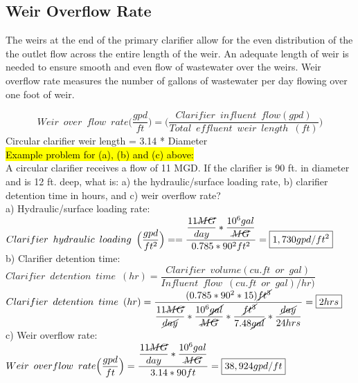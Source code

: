 \subsection{Weir Overflow Rate}
The weirs at the end of the primary clarifier allow for the even distribution of the the outlet flow across the entire length of the weir.  An adequate length of weir is needed to ensure smooth and even flow of wastewater over the weirs.  Weir overflow rate measures the number of gallons of wastewater per day flowing over one foot of weir. 

		$$Weir \enspace over \enspace flow \enspace rate \Big(\dfrac{gpd}{ft}\Big) =\Big(\dfrac{Clarifier \enspace influent \enspace  flow (gpd)}{Total \enspace effluent 					\enspace weir \enspace length \enspace (ft)}\Big)$$
		Circular clarifier weir length = 3.14 * Diameter\\

\hl{Example problem for (a), (b) and (c) above:}\\
		\vspace{0.2cm}
A circular clarifier receives a flow of 11 MGD.  If the clarifier is 90 ft. in diameter and is 12 ft. deep, what is: a) the hydraulic/surface loading rate, b) clarifier detention time in hours, and c) weir overflow rate?\\
		\vspace{0.2cm}
a) Hydraulic/surface loading rate:\\
$Clarifier \enspace hydraulic \enspace loading \enspace 	\Big(\dfrac{gpd}{ft^2}\Big) ==\dfrac{\dfrac{11\cancel{MG}}{{day}}*\dfrac{10^6gal}{\cancel{MG}}}{0.785*90^2 ft^2}=\boxed{1,730gpd/ft^2}$\\
		\vspace{0.5cm}
b) Clarifier detention time:\\
$Clarifier \enspace detention \enspace time \enspace (hr) = 	\dfrac{ Clarifier \enspace volume (cu.ft \enspace or \enspace gal)}{Influent \enspace flow \enspace (cu.ft \enspace or \enspace gal)/hr)}$\\
		\vspace{0.2cm}
$Clarifier \enspace detention \enspace time \enspace (hr) = 	\dfrac{(0.785*90^2*15)\cancel{ft^3}}{\dfrac{11\cancel{MG}}{\cancel{day}}*\dfrac{10^6\cancel{gal}}{\cancel{MG}}*\dfrac{\cancel{ft^3}}{7.48\cancel{gal}}*\dfrac{\cancel{day}}{24hrs}}=\boxed{2hrs}$\\
		\vspace{0.5cm}
c) Weir overflow rate:\\
		\vspace{0.2cm} 
$Weir \enspace overflow \enspace rate \Big(\dfrac{gpd}{ft}\Big) =\dfrac{\dfrac{11\cancel{MG}}{{day}}*\dfrac{10^6gal}{\cancel{MG}}}{3.14*90 ft}=\boxed{38,924gpd/ft}$\\

